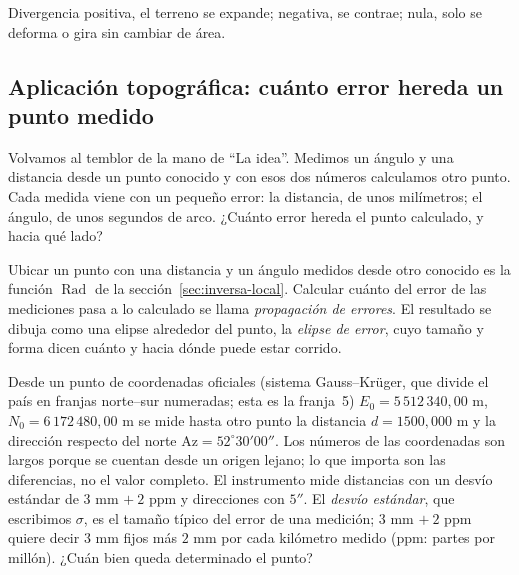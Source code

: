 \begin{idea}
Divergencia positiva, el terreno se expande; negativa, se contrae; nula, solo se deforma o
gira sin cambiar de área.
\end{idea}

\subsection{Aplicación topográfica: cuánto error hereda un punto medido}\label{sec:aplicacion-radiacion}

Volvamos al temblor de la mano de \enquote{La idea}. Medimos un ángulo y una distancia desde un
punto conocido y con esos dos números calculamos otro punto. Cada medida viene con un pequeño
error: la distancia, de unos milímetros; el ángulo, de unos segundos de arco. ¿Cuánto error
hereda el punto calculado, y hacia qué lado?

\begin{idea}
Ubicar un punto con una distancia y un ángulo medidos desde otro conocido es la función \(\operatorname{Rad}\)
de la sección~\ref{sec:inversa-local}. Calcular cuánto del error de las mediciones pasa a lo
calculado se llama \emph{propagación de errores}. El resultado se dibuja como una elipse
alrededor del punto, la \emph{elipse de error}, cuyo tamaño y forma dicen cuánto y hacia dónde
puede estar corrido.
\end{idea}

Desde un punto de coordenadas oficiales (sistema Gauss--Krüger, que divide el país en franjas
norte--sur numeradas; esta es la franja~5) \(E_0=5\,512\,340{,}00\) m,
\(N_0=6\,172\,480{,}00\) m se mide hasta otro punto la distancia \(d=1500{,}000\) m y la
dirección respecto del norte \(\mathrm{Az}=52^\circ30'00''\). Los números de las coordenadas son
largos porque se cuentan desde un origen lejano; lo que importa son las diferencias, no el
valor completo. El instrumento mide distancias con un desvío estándar de \(3\) mm \(+\ 2\) ppm y
direcciones con \(5''\). El \emph{desvío estándar}, que escribimos \(\sigma\), es el tamaño
típico del error de una medición; \(3\) mm \(+\ 2\) ppm quiere decir \(3\) mm fijos más \(2\) mm
por cada kilómetro medido (ppm: partes por millón). ¿Cuán bien queda determinado el punto?


